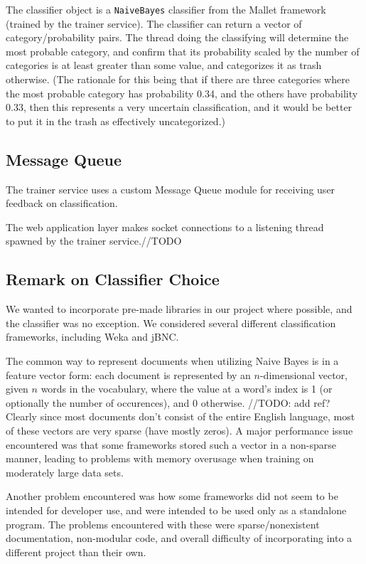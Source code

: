 \documentclass[letterpaper]{article}
\begin{document}
The classifier object is a \texttt{NaiveBayes} classifier from the Mallet framework (trained by the trainer service). The classifier can return a vector of category/probability pairs. The thread doing the classifying will determine the most probable category, and confirm that its probability scaled by the number of categories is at least greater than some value, and categorizes it as trash otherwise. (The rationale for this being that if there are three categories where the most probable category has probability 0.34, and the others have probability 0.33, then this represents a very uncertain classification, and it would be better to put it in the trash as effectively uncategorized.)

\subsection{Message Queue}
\label{MessageQueueSection}
The trainer service uses a custom Message Queue module for receiving user feedback on classification.

The web application layer makes socket connections to a listening thread spawned by the trainer service.//TODO

\subsection{Remark on Classifier Choice}
We wanted to incorporate pre-made libraries in our project where possible, and the classifier was no exception. We considered several different classification frameworks, including Weka and jBNC.

The common way to represent documents when utilizing Naive Bayes is in a feature vector form: each document is represented by an $n$-dimensional vector, given $n$ words in the vocabulary, where the value at a word's index is 1 (or optionally the number of occurences), and 0 otherwise. //TODO: add ref?
Clearly since most documents don't consist of the entire English language, most of these vectors are very sparse (have mostly zeros).
A major performance issue encountered was that some frameworks stored such a vector in a non-sparse manner, leading to problems with memory overusage when training on moderately large data sets.

Another problem encountered was how some frameworks did not seem to be intended for developer use, and were intended to be used only as a standalone program. The problems encountered with these were sparse/nonexistent documentation, non-modular code, and overall difficulty of incorporating into a different project than their own.
\end{document}
